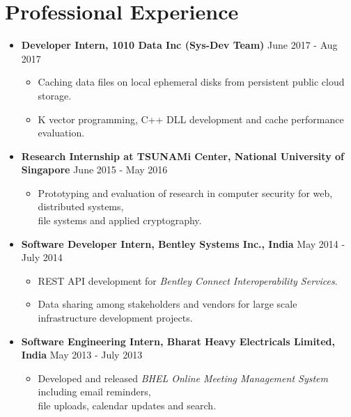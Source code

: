 \documentclass{article}
\newcommand{\bi}{\vspace{-1mm}\begin{itemize}[align=left,leftmargin=*, labelindent=0pt,labelsep=2pt, label={-}, nosep]}
\newcommand{\ei}{\end{itemize}}
\begin{document}
\section*{Professional Experience}
\begin{itemize}
    \item \textbf{Developer Intern, 1010 Data Inc (Sys-Dev Team)} {\hfill June 2017 - Aug 2017}
    \bi
        \item Caching data files on local ephemeral disks from persistent public cloud storage.
        \item K vector programming, C++ DLL development and cache performance evaluation.
    \ei

    \item \textbf{Research Internship at TSUNAMi Center, National University of Singapore} {\hfill June 2015 - May 2016}
    \bi
        \item Prototyping and evaluation of research in computer security for web, distributed systems,\\
        file systems and applied cryptography.
    \ei
    
    \item \textbf{Software Developer Intern, Bentley Systems Inc., India} {\hfill May 2014 - July 2014}
    \bi
        \item REST API development for \textit{Bentley Connect Interoperability Services}.
        \item Data sharing among stakeholders and vendors for large scale infrastructure development projects.
    \ei

    \item \textbf{Software Engineering Intern, Bharat Heavy Electricals Limited, India} {\hfill May 2013 - July 2013}
    \bi
        \item Developed and released \textit{BHEL Online Meeting Management System} including email reminders,\\
        file uploads, calendar updates and search.
    \ei 
\end{itemize}
\end{document}
